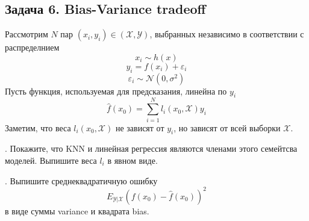 \documentclass[12pt,a4paper]{article}
\begin{document}
\newpage
 
\subsection*{Задача 6.  Bias-Variance tradeoff}

Рассмотрим $N$ пар $(x_i, y_i) \in (\mathcal{X}, \mathcal{Y})$, выбранных независимо в соответствии с распределнием
\[
x_i \sim h(x)
\]
\[
y_i = f(x_i) + \varepsilon_i
\]
\[
\varepsilon_i \sim \mathcal{N}(0, \sigma^2)
\]
Пусть функция, используемая для предсказания, линейна по $y_i$
\[
\hat f(x_0) = \sum_{i=1}^N l_i(x_0, \mathcal{X}) y_i
\] 
Заметим, что веса $l_i(x_0, \mathcal{X})$ не зависят от $y_i$, но зависят от всей выборки $\mathcal{X}$.

\vspace{1em}
. Покажите, что KNN и линейная регрессия являются членами этого семейтсва моделей. Выпишите веса $l_i$ в явном виде.

. Выпишите среднеквадратичную ошибку
\[
E_{\mathcal{Y} | \mathcal{X}} (f(x_0) - \hat f(x_0))^2
\]
в виде суммы variance и квадрата bias.
 
\end{document}
